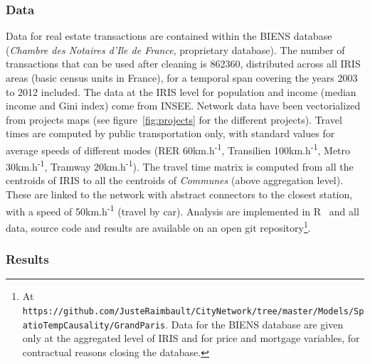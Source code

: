 \documentclass[english]{./sageo}
\begin{document}
\subsubsection{Data}

Data for real estate transactions are contained within the BIENS database (\emph{Chambre des Notaires d'Ile de France}, proprietary database). The number of transactions that can be used after cleaning is 862360, distributed across all IRIS areas (basic census units in France), for a temporal span covering the years 2003 to 2012 included. The data at the IRIS level for population and income (median income and Gini index) come from INSEE. Network data have been vectorialized from projects maps (see figure~\ref{fig:projects} for the different projects). Travel times are computed by public transportation only, with standard values for average speeds of different modes (RER 60km.h\textsuperscript{-1}, Transilien 100km.h\textsuperscript{-1}, Metro 30km.h\textsuperscript{-1}, Tramway 20km.h\textsuperscript{-1}). The travel time matrix is computed from all the centroids of IRIS to all the centroids of \emph{Communes} (above aggregation level). These are linked to the network with abstract connectors to the closest station, with a speed of 50km.h\textsuperscript{-1} (travel by car). Analysis are implemented in R~\cite{rcoreteam} and all data, source code and results are available on an open git repository\footnote{At\\\texttt{https://github.com/JusteRaimbault/CityNetwork/tree/master/Models/SpatioTempCausality/GrandParis}. Data for the BIENS database are given only at the aggregated level of IRIS and for price and mortgage variables, for contractual reasons closing the database.}.



\subsubsection{Results}
\end{document}
